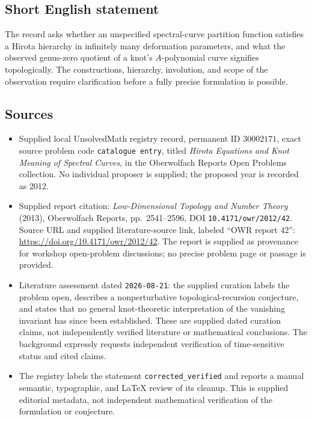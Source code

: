 \documentclass[11pt]{article}
\begin{document}
\subsection{Short English statement}
The record asks whether an unspecified spectral-curve partition function satisfies a Hirota hierarchy in infinitely many deformation parameters, and what the observed genus-zero quotient of a knot's \(A\)-polynomial curve signifies topologically. The constructions, hierarchy, involution, and scope of the observation require clarification before a fully precise formulation is possible.
\subsection{Sources}
\begin{itemize}
\item Supplied local UnsolvedMath registry record, permanent ID \(30002171\), exact source problem code \texttt{catalogue entry}, titled \emph{Hirota Equations and Knot Meaning of Spectral Curves}, in the Oberwolfach Reports Open Problems collection. No individual proposer is supplied; the proposed year is recorded as 2012.
\item Supplied report citation: \emph{Low-Dimensional Topology and Number Theory} (2013), Oberwolfach Reports, pp.\ 2541--2596, DOI \texttt{10.4171/owr/2012/42}. Source URL and supplied literature-source link, labeled ``OWR report 42'': \url{https://doi.org/10.4171/owr/2012/42}. The report is supplied as provenance for workshop open-problem discussions; no precise problem page or passage is provided.
\item Literature assessment dated \texttt{2026-08-21}: the supplied curation labels the problem open, describes a nonperturbative topological-recursion conjecture, and states that no general knot-theoretic interpretation of the vanishing invariant has since been established. These are supplied dated curation claims, not independently verified literature or mathematical conclusions. The background expressly requests independent verification of time-sensitive status and cited claims.
\item The registry labels the statement \texttt{corrected\_verified} and reports a manual semantic, typographic, and LaTeX review of its cleanup. This is supplied editorial metadata, not independent mathematical verification of the formulation or conjecture.
\end{itemize}
\end{document}
